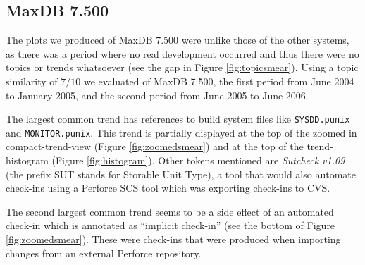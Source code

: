 \documentclass[times, 10pt,twocolumn]{article}
\newcommand{\shrinkit}{\vspace*{-.3em}}
\begin{document}


\shrinkit
\subsection{MaxDB 7.500}
\shrinkit






The plots we produced of MaxDB 7.500 were unlike those of the other
systems, as there was a period where no real development occurred and
thus there were no topics or trends whatsoever (see the gap in Figure
\ref{fig:topicsmear}). Using a topic similarity of $7/10$ we evaluated
of MaxDB 7.500, the first period from June 2004 to January 2005, and
the second period from June 2005 to June 2006.

The largest common trend has references to build system files like
\texttt{SYSDD.punix} and \texttt{MONITOR.punix}.  This trend is
partially displayed at the top of the zoomed in compact-trend-view
(Figure \ref{fig:zoomedsmear}) and at the top of the trend-histogram
(Figure \ref{fig:histogram}).  Other tokens mentioned are
\emph{Sutcheck v1.09} (the prefix SUT stands for Storable Unit
Type), a tool that would also automate check-ins using a Perforce SCS tool
which was exporting check-ins to CVS.

The second largest common trend seems to be a side effect of an
automated check-in which is annotated as ``implicit check-in'' (see
the bottom of Figure \ref{fig:zoomedsmear}). These were check-ins that
were produced when importing changes from an external Perforce
repository.
\end{document}
